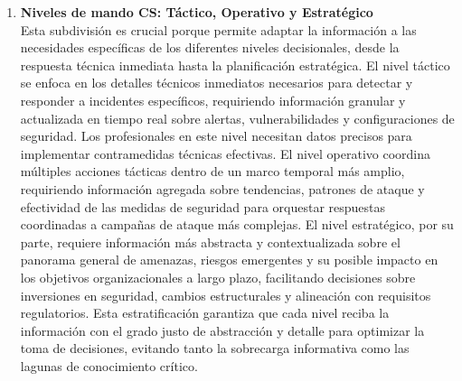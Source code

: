 \begin{enumerate}
\item \textbf{Niveles de mando CS: Táctico, Operativo y Estratégico} \\
Esta subdivisión es crucial porque permite adaptar la información a las necesidades específicas de los diferentes niveles decisionales, desde la respuesta técnica inmediata hasta la planificación estratégica. El nivel táctico se enfoca en los detalles técnicos inmediatos necesarios para detectar y responder a incidentes específicos, requiriendo información granular y actualizada en tiempo real sobre alertas, vulnerabilidades y configuraciones de seguridad. Los profesionales en este nivel necesitan datos precisos para implementar contramedidas técnicas efectivas. El nivel operativo coordina múltiples acciones tácticas dentro de un marco temporal más amplio, requiriendo información agregada sobre tendencias, patrones de ataque y efectividad de las medidas de seguridad para orquestar respuestas coordinadas a campañas de ataque más complejas. El nivel estratégico, por su parte, requiere información más abstracta y contextualizada sobre el panorama general de amenazas, riesgos emergentes y su posible impacto en los objetivos organizacionales a largo plazo, facilitando decisiones sobre inversiones en seguridad, cambios estructurales y alineación con requisitos regulatorios. Esta estratificación garantiza que cada nivel reciba la información con el grado justo de abstracción y detalle para optimizar la toma de decisiones, evitando tanto la sobrecarga informativa como las lagunas de conocimiento crítico.
\end{enumerate}

